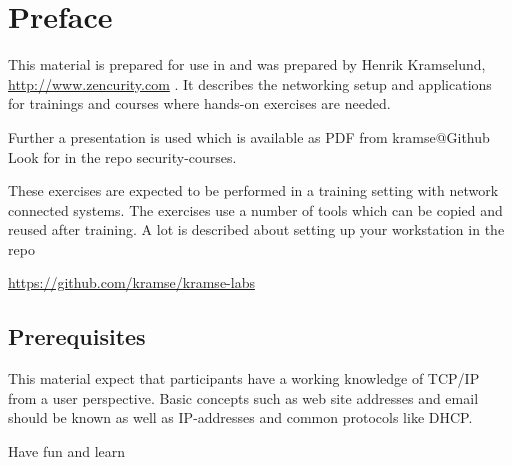 \documentclass[a4paper,11pt,notitlepage]{report}
\begin{document}
{}

\newcommand{\kursus}[1]{Introduction to Incident Response Elective, KEA}
\newcommand{\kursusnavn}[1]{Introduction to Incident Response Elective, KEA\\ exercises}


\setcounter{tocdepth}{0}

\normal

{\color{titlecolor}\tableofcontents}

\normal
\pagestyle{fancyplain}
\chapter*{\color{titlecolor}Preface}

This material is prepared for use in \emph{\kursus} and was prepared by
Henrik Kramselund, \url{http://www.zencurity.com} .
It describes the networking setup and
applications for trainings and courses where hands-on exercises are needed.

Further a presentation is used which is available as PDF from kramse@Github\\
Look for \jobname in the repo security-courses.

These exercises are expected to be performed in a training setting with network connected systems. The exercises use a number of tools which can be copied and reused after training. A lot is described about setting up your workstation in the repo

\url{https://github.com/kramse/kramse-labs}


\section*{\color{titlecolor}Prerequisites}

This material expect that participants have a working knowledge of
TCP/IP from a user perspective. Basic concepts such as web site addresses and email should be known as well as IP-addresses and common protocols like DHCP.

\vskip 1cm
Have fun and learn
\eject

\rhead{\fancyplain{}{\bf \chaptername\ \thechapter}}

\end{document}
